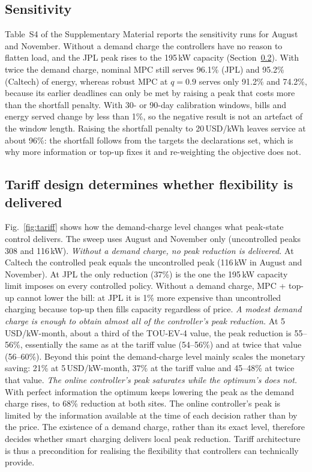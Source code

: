 \subsection{Sensitivity}
Table~S4 of the Supplementary Material reports the sensitivity runs for August and November. Without a demand charge the controllers have no reason to flatten load, and the JPL peak rises to the 195\,kW capacity (Section~\ref{sec:res:tariff}). With twice the demand charge, nominal MPC still serves 96.1\% (JPL) and 95.2\% (Caltech) of energy, whereas robust MPC at $q=0.9$ serves only 91.2\% and 74.2\%, because its earlier deadlines can only be met by raising a peak that costs more than the shortfall penalty. With 30- or 90-day calibration windows, bills and energy served change by less than 1\%, so the negative result is not an artefact of the window length. Raising the shortfall penalty to 20\,USD/kWh leaves service at about 96\%: the shortfall follows from the targets the declarations set, which is why more information or top-up fixes it and re-weighting the objective does not.

\subsection{Tariff design determines whether flexibility is delivered}\label{sec:res:tariff}
Fig.~\ref{fig:tariff} shows how the demand-charge level changes what peak-state control delivers. The sweep uses August and November only (uncontrolled peaks 308 and 116\,kW).
\emph{Without a demand charge, no peak reduction is delivered.} At Caltech the controlled peak equals the uncontrolled peak (116\,kW in August and November). At JPL the only reduction (37\%) is the one the 195\,kW capacity limit imposes on every controlled policy. Without a demand charge, MPC + top-up cannot lower the bill: at JPL it is 1\% more expensive than uncontrolled charging because top-up then fills capacity regardless of price. \emph{A modest demand charge is enough to obtain almost all of the controller's peak reduction.} At 5\,USD/kW-month, about a third of the TOU-EV-4 value, the peak reduction is 55--56\%, essentially the same as at the tariff value (54--56\%) and at twice that value (56--60\%). Beyond this point the demand-charge level mainly scales the monetary saving: 21\% at 5\,USD/kW-month, 37\% at the tariff value and 45--48\% at twice that value. \emph{The online controller's peak saturates while the optimum's does not.} With perfect information the optimum keeps lowering the peak as the demand charge rises, to 68\% reduction at both sites. The online controller's peak is limited by the information available at the time of each decision rather than by the price.
The existence of a demand charge, rather than its exact level, therefore decides whether smart charging delivers local peak reduction. Tariff architecture is thus a precondition for realising the flexibility that controllers can technically provide.





